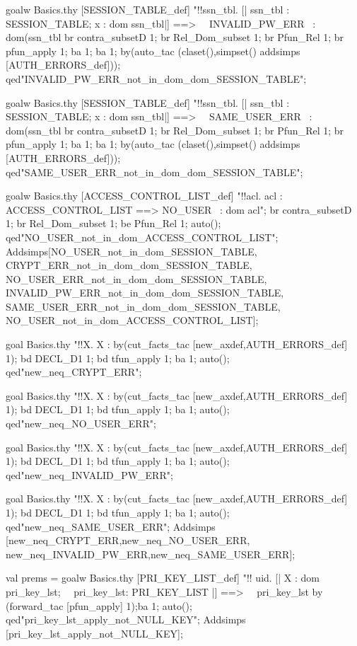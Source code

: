 \documentclass[a4paper,pdftex]{article}
\newenvironment{holz-proof}{\comment}{\endcomment}
\begin{document}
\begin{holz-proof}
goalw Basics.thy [SESSION_TABLE_def] 
"!!ssn_tbl. [| ssn_tbl : SESSION_TABLE; x : dom ssn_tbl|] ==> \
\ INVALID_PW_ERR ~: dom(ssn_tbl %
br contra_subsetD 1;
br Rel_Dom_subset 1;
br Pfun_Rel 1;
br pfun_apply 1; ba 1; ba 1;
by(auto_tac (claset(),simpset() addsimps [AUTH_ERRORS_def]));
qed"INVALID_PW_ERR_not_in_dom_dom_SESSION_TABLE";

goalw Basics.thy [SESSION_TABLE_def] 
"!!ssn_tbl. [| ssn_tbl : SESSION_TABLE; x : dom ssn_tbl|] ==> \
\ SAME_USER_ERR ~: dom(ssn_tbl %
br contra_subsetD 1;
br Rel_Dom_subset 1;
br Pfun_Rel 1;
br pfun_apply 1; ba 1; ba 1;
by(auto_tac (claset(),simpset() addsimps [AUTH_ERRORS_def]));
qed"SAME_USER_ERR_not_in_dom_dom_SESSION_TABLE";




goalw Basics.thy [ACCESS_CONTROL_LIST_def] 
"!!acl. acl : ACCESS_CONTROL_LIST ==> NO_USER ~: dom acl";
br contra_subsetD 1;
br Rel_Dom_subset 1;
be Pfun_Rel 1;
auto();
qed"NO_USER_not_in_dom_ACCESS_CONTROL_LIST";
Addsimps[NO_USER_not_in_dom_SESSION_TABLE,
         CRYPT_ERR_not_in_dom_dom_SESSION_TABLE,
         NO_USER_ERR_not_in_dom_dom_SESSION_TABLE,
         INVALID_PW_ERR_not_in_dom_dom_SESSION_TABLE,
         SAME_USER_ERR_not_in_dom_dom_SESSION_TABLE,
         NO_USER_not_in_dom_ACCESS_CONTROL_LIST];



goal Basics.thy "!!X. X : %
by(cut_facts_tac [new_axdef,AUTH_ERRORS_def] 1);
bd DECL_D1 1;
bd tfun_apply 1; ba 1;
auto();
qed"new_neq_CRYPT_ERR";

goal Basics.thy "!!X. X : %
by(cut_facts_tac [new_axdef,AUTH_ERRORS_def] 1);
bd DECL_D1 1;
bd tfun_apply 1; ba 1;
auto();
qed"new_neq_NO_USER_ERR";

goal Basics.thy "!!X. X : %
by(cut_facts_tac [new_axdef,AUTH_ERRORS_def] 1);
bd DECL_D1 1;
bd tfun_apply 1; ba 1;
auto();
qed"new_neq_INVALID_PW_ERR";

goal Basics.thy "!!X. X : %
by(cut_facts_tac [new_axdef,AUTH_ERRORS_def] 1);
bd DECL_D1 1;
bd tfun_apply 1; ba 1;
auto();
qed"new_neq_SAME_USER_ERR";
Addsimps [new_neq_CRYPT_ERR,new_neq_NO_USER_ERR,
          new_neq_INVALID_PW_ERR,new_neq_SAME_USER_ERR];


val prems = goalw Basics.thy [PRI_KEY_LIST_def]
"!! uid. [| X : dom pri_key_lst;                         \
\           pri_key_lst: PRI_KEY_LIST |] ==>             \
\   pri_key_lst %
by (forward_tac [pfun_apply] 1);ba 1;
auto();
qed"pri_key_lst_apply_not_NULL_KEY";
Addsimps [pri_key_lst_apply_not_NULL_KEY];



\end{holz-proof}
\end{document}
